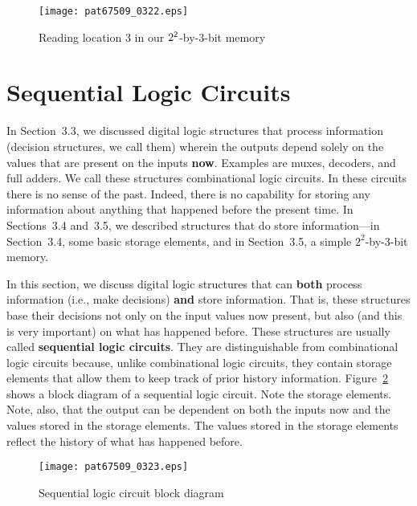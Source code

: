 \documentclass{patt}
\begin{document}
\begin{figure}
\centerline{\texttt{[image: pat67509\_0322.eps]}}
\caption{Reading location 3 in
  our $2^{\sf 2}$-by-3-bit memory}
\label{fig:memread}
\vspace{6pt}
\end{figure}

\vspace{-12pt}

\FloatBarrier
\section{Sequential Logic Circuits}

In Section~3.3, we discussed digital logic structures that process
information (decision structures, we call them) wherein the outputs
depend solely on the values that are present on the inputs {\bf now}.
Examples are muxes, decoders, and full adders.  We call these
structures combinational logic circuits.  In these circuits there is
no sense of the past.  Indeed, there is no capability for storing any
information about anything that happened before the present time.  In
Sections~3.4 and~3.5, we described structures that do store
information---in Section~3.4, some basic storage elements, and in
Section~3.5, a simple $2^{2}$-by-3-bit memory.

In this section, we discuss digital logic structures that can {\bf both} 
process information (i.e., make decisions) {\bf and} store
information. \lightbulb[-18pt] That is, these structures base their decisions 
not only on the input values now present, but also (and this is very important)
on what has happened before.  These structures are usually called {\bf
  sequential logic circuits}.  They are distinguishable from
combinational logic circuits because, unlike combinational logic
circuits, they contain storage elements that allow them to keep track
of prior history information.  Figure~\ref{fig:seq_logic_circuit} shows a block 
diagram of a sequential logic circuit.  Note the storage elements.  Note, also,
that the output can be dependent on both the inputs now and the values
stored in the storage elements.  The values stored in the storage
elements reflect the history of what has happened before.

\begin{figure}
\vspace{2pt}
\centerline{\texttt{[image: pat67509\_0323.eps]}}
\caption{Sequential logic circuit block diagram}
\label{fig:seq_logic_circuit}
\end{figure}
\end{document}
